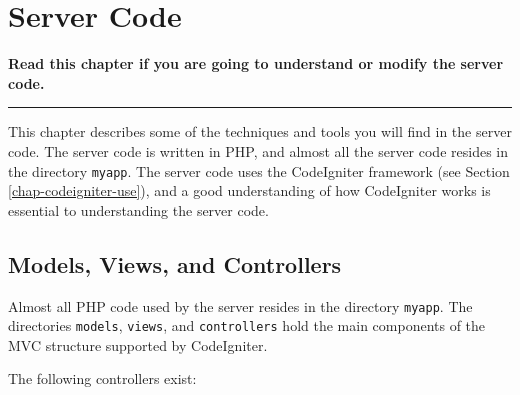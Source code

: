\documentclass[11pt,oneside,a4paper]{memoir}
\begin{document}
\chapter{Server Code}\label{chap-server-code}

\textbf{Read this chapter if you are going to understand or modify the server code.}
\plainbreak{3}

This chapter describes some of the techniques and tools you will find in the server code. The server
code is written in PHP, and almost all the server code resides in the directory \texttt{myapp}. The
server code uses the CodeIgniter framework (see Section \ref{chap-codeigniter-use}), and a good
understanding of how CodeIgniter works is essential to understanding the server code.

\section{Models, Views, and Controllers}

Almost all PHP code used by the server resides in the directory \texttt{myapp}. The directories
\texttt{models}, \texttt{views}, and \texttt{controllers} hold the main components of the MVC
structure supported by CodeIgniter.

The following controllers exist:
\end{document}
